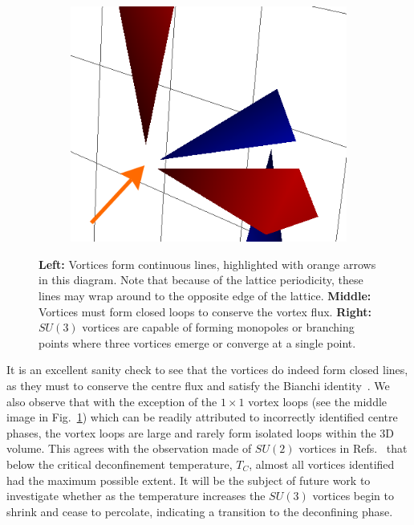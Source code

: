 \begin{figure}[htb!]
\begin{subfigure}[b]{0.3\textwidth}
    \end{subfigure}\hfill
    \begin{subfigure}[b]{0.3\textwidth}
	\includegraphics[width=\textwidth]{./plaqt1_monopole.png}
    \end{subfigure}
    \caption[Examples of the properties of projected vortices.]{\label{fig:VortexFeatures} \textbf{Left:} Vortices form continuous lines, highlighted with orange arrows in this diagram. Note that because of the lattice periodicity, these lines may wrap around to the opposite edge of the lattice. \textbf{Middle:} Vortices must form closed loops to conserve the vortex flux. \textbf{Right:} $SU(3)$ vortices are capable of forming monopoles or branching points where three vortices emerge or converge at a single point.}
\end{figure}
%
It is an excellent sanity check to see that the vortices do indeed form closed lines, as they must to conserve the centre flux and satisfy the Bianchi identity~\cite{Engelhardt:2003wm,Spengler:2018dxt}. We also observe that with the exception of the $1\times 1$ vortex loops (see the middle image in Fig.~\ref{fig:VortexFeatures}) which can be readily attributed to incorrectly identified centre phases, the vortex loops are large and rarely form isolated loops within the 3D volume. This agrees with the observation made of $SU(2)$ vortices in Refs.~\cite{Engelhardt:1999fd,Bertle:1999tw} that below the critical deconfinement temperature, $T_C$, almost all vortices identified had the maximum possible extent. It will be the subject of future work to investigate whether as the temperature increases the $SU(3)$ vortices begin to shrink and cease to percolate, indicating a transition to the deconfining phase.\\

